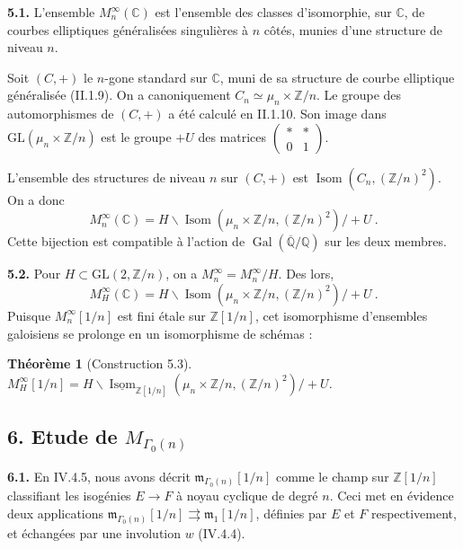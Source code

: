 \documentclass[10pt,a4paper]{amsart}
\theoremstyle{plain}
\newtheorem{theorem}{Th\'eor\`eme}[section]
\theoremstyle{definition}
\DeclareMathOperator{\Isom}{Isom}
\newcommand{\m}{\mathfrak{m}}
\newcommand{\ZZ}{\mathbb{Z}}
\newcommand{\QQ}{\mathbb{Q}}
\newcommand{\CC}{\mathbb{C}}
\newcommand{\GL}{\mathrm{GL}}
\DeclareMathOperator{\Gal}{Gal}
\begin{document}
\setcounter{theorem}{0}
\setcounter{subsection}{4}
\setcounter{theorem}{0}

\medskip\noindent\textbf{5.1.} L'ensemble $M_n^\infty(\CC)$ est l'ensemble des classes d'isomorphie, sur $\CC$, de courbes elliptiques g\'en\'eralis\'ees singuli\`eres \`a $n$ c\^ot\'es, munies d'une structure de niveau $n$.

Soit $(C,+)$ le $n$-gone standard sur $\CC$, muni de sa structure de courbe elliptique g\'en\'eralis\'ee (II.1.9). On a canoniquement $C_n \simeq \mu_n \times \ZZ/n$. Le groupe des automorphismes de $(C,+)$ a \'et\'e calcul\'e en II.1.10. Son image dans $\GL(\mu_n \times \ZZ/n)$ est le groupe $+U$ des matrices $\begin{pmatrix} * & * \\ 0 & 1 \end{pmatrix}$.

L'ensemble des structures de niveau $n$ sur $(C,+)$ est $\Isom(C_n, (\ZZ/n)^2)$. On a donc
\[
M_n^\infty(\CC) = H \backslash \Isom(\mu_n \times \ZZ/n, (\ZZ/n)^2) / +U\ .
\]
Cette bijection est compatible \`a l'action de $\Gal(\overline{\QQ}/\QQ)$ sur les deux membres.

\medskip\noindent\textbf{5.2.} Pour $H \subset \GL(2,\ZZ/n)$, on a $M_n^\infty = M_n^\infty / H$. Des lors,
\[
M_H^\infty(\CC) = H \backslash \Isom(\mu_n \times \ZZ/n, (\ZZ/n)^2) / +U\ .
\]
Puisque $M_n^\infty[1/n]$ est fini \'etale sur $\ZZ[1/n]$, cet isomorphisme d'ensembles galoisiens se prolonge en un isomorphisme de sch\'emas :

\setcounter{theorem}{2}
\begin{theorem}[Construction 5.3]
$M_H^\infty[1/n] = H \backslash \underline{\Isom}_{\ZZ[1/n]}(\mu_n \times \ZZ/n, (\ZZ/n)^2) / +U$.
\end{theorem}


\subsection*{6. Etude de $M_{\Gamma_0(n)}$}

\setcounter{theorem}{0}
\setcounter{subsection}{5}
\setcounter{theorem}{0}

\medskip\noindent\textbf{6.1.} En IV.4.5, nous avons d\'ecrit $\m_{\Gamma_0(n)}[1/n]$ comme le champ sur $\ZZ[1/n]$ classifiant les isog\'enies $E \to F$ \`a noyau cyclique de degr\'e $n$. Ceci met en \'evidence deux applications $\m_{\Gamma_0(n)}[1/n] \rightrightarrows \m_1[1/n]$, d\'efinies par $E$ et $F$ respectivement, et \'echang\'ees par une involution $w$ (IV.4.4).
\end{document}
